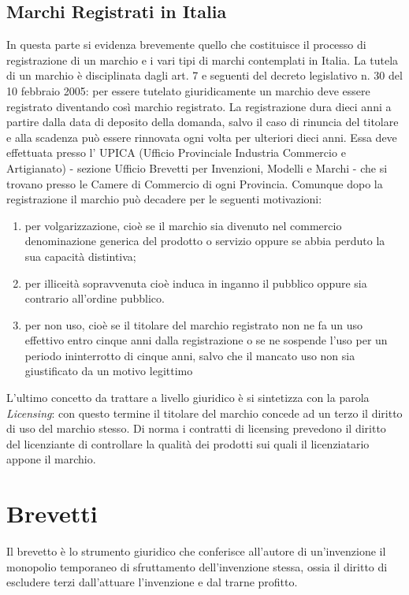 \subsection{Marchi Registrati in Italia}
In questa parte si evidenza brevemente quello che costituisce il processo di registrazione di un marchio e i vari tipi di marchi contemplati in Italia.
La tutela di un marchio è disciplinata dagli art. 7 e seguenti del decreto legislativo n. 30 del 10 febbraio 2005: per essere tutelato giuridicamente un marchio deve essere registrato diventando così marchio registrato. La registrazione dura dieci anni a partire dalla data di deposito della domanda, salvo il caso di rinuncia del titolare e alla scadenza può essere rinnovata ogni volta per ulteriori dieci anni.
Essa deve effettuata presso l' UPICA (Ufficio Provinciale Industria Commercio e Artigianato) - sezione Ufficio Brevetti per Invenzioni, Modelli e Marchi - che si trovano presso le Camere di Commercio di ogni Provincia.
Comunque dopo la registrazione il marchio può decadere per le seguenti motivazioni:

\begin{enumerate}
\item  per volgarizzazione, cioè se il marchio sia divenuto nel commercio denominazione generica del prodotto o servizio oppure se abbia perduto la sua capacità distintiva;
\item per illiceità sopravvenuta cioè induca in inganno il pubblico  oppure sia contrario all'ordine pubblico.
\item per non uso, cioè se il titolare del marchio registrato non ne fa un uso effettivo entro cinque anni dalla registrazione o se ne sospende l'uso per un periodo ininterrotto di cinque anni, salvo che il mancato uso non sia giustificato da un motivo legittimo
\end{enumerate}

L'ultimo concetto da trattare a livello giuridico è si sintetizza con la parola  \textit{Licensing}: con questo termine il titolare del marchio concede ad un terzo il diritto di uso del marchio stesso. Di norma i contratti di licensing prevedono il diritto del licenziante di controllare la qualità dei prodotti sui quali il licenziatario appone il marchio.



\section{Brevetti} \label{sec:brevetti}
Il brevetto è lo strumento giuridico che conferisce all'autore di un'invenzione il monopolio temporaneo di sfruttamento dell'invenzione stessa, ossia il diritto di escludere terzi dall'attuare l'invenzione e dal trarne profitto.

